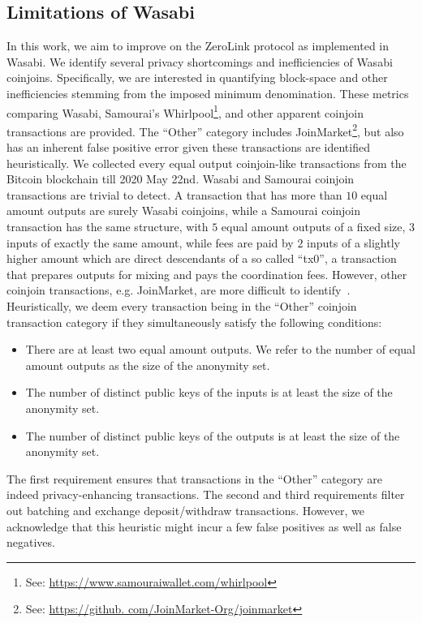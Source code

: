 \documentclass[a4paper]{article}
\begin{document}
\subsection{Limitations of Wasabi}\label{sec:limitations}
In this work, we aim to improve on the ZeroLink protocol as implemented in Wasabi. We identify several privacy shortcomings and inefficiencies of Wasabi coinjoins. Specifically, we are interested in quantifying block-space and other inefficiencies stemming from the imposed minimum denomination. These metrics comparing Wasabi, Samourai's Whirlpool\footnote{See: \url{https://www.samouraiwallet.com/whirlpool}}, and other apparent coinjoin transactions are provided. The ``Other'' category includes JoinMarket\footnote{See: \url{https://github. com/JoinMarket-Org/joinmarket}}, but also has an inherent false positive error given these transactions are identified heuristically. We collected every equal output coinjoin-like transactions from the Bitcoin blockchain till 2020 May 22nd. Wasabi and Samourai coinjoin transactions are trivial to detect. A transaction that has more than $10$ equal amount outputs are surely Wasabi coinjoins, while a Samourai coinjoin transaction has the same structure, with $5$ equal amount outputs of a fixed size, $3$ inputs of exactly the same amount, while fees are paid by $2$ inputs of a slightly higher amount which are direct descendants of a so called ``tx0'', a transaction that prepares outputs for mixing and pays the coordination fees. However, other coinjoin transactions, e.g. JoinMarket, are more difficult to identify~\cite{moeser2017anonymous}. Heuristically, we deem every transaction being in the ``Other'' coinjoin transaction category if they simultaneously satisfy the following conditions:

\begin{itemize}
    \item There are at least two equal amount outputs. We refer to the number of equal amount outputs as the size of the anonymity set.
    \item The number of distinct public keys of the inputs is at least the size of the anonymity set.
    \item The number of distinct public keys of the outputs is at least the size of the anonymity set.
\end{itemize}

The first requirement ensures that transactions in the ``Other'' category are indeed privacy-enhancing transactions. The second and third requirements filter out batching and exchange deposit/withdraw transactions. However, we acknowledge that this heuristic might incur a few false positives as well as false negatives.
\end{document}
